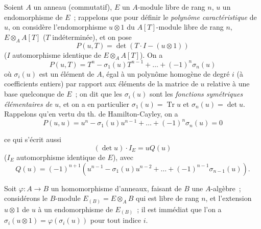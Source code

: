 \begin{env}[6.4.1]
\label{II.6.4.1-fr}
Soient $A$ un anneau (commutatif), $E$ un $A$-module libre de rang $n$, $u$
un endomorphisme de $E$~; rappelons que pour définir le \emph{polynôme
caractéristique} de $u$, on considère l'endomorphisme $u\otimes1$ du
$A[T]$-module libre de rang $n$, $E\otimes_AA[T]$ ($T$ indéterminée), et on
pose
\[
\label{II.6.4.1.1-fr}
P(u,T)=\det(T\cdot I-(u\otimes1))
\tag{6.4.1.1}
\]
($I$ automorphisme identique de $E\otimes_AA[T]$). On a
\[
\label{II.6.4.1.2-fr}
P(u,T)=T^n-\sigma_1(u)T^{n-1}+\ldots+(-1)^n\sigma_n(u)
\tag{6.4.1.2}
\]
où $\sigma_i(u)$ est un élément de $A$, égal à un polynôme homogène de degré
$i$ (à coefficients entiers) par rapport aux éléments de la matrice de $u$
relative à une base quelconque de $E$~; on dit que les $\sigma_i(u)$ sont les
\emph{fonctions symétriques élémentaires de $u$}, et on a en particulier
$\sigma_1(u)=\operatorname{Tr}u$ et $\sigma_n(u)=\det u$. Rappelons qu'en
vertu du th. de Hamilton-Cayley, on a
\[
\label{II.6.4.1.3-fr}
P(u,u)=u^n-\sigma_1(u)u^{n-1}+\ldots+(-1)^n\sigma_n(u)=0
\tag{6.4.1.3}
\]


ce qui s'écrit aussi
\[
\label{II.6.4.1.4-fr}
(\det u)\cdot I_E=uQ(u)
\tag{6.4.1.4}
\]
($I_E$ automorphisme identique de $E$), avec
\[
\label{II.6.4.1.5-fr}
Q(u)=(-1)^{n+1}(u^{n-1}-\sigma_1(u)u^{n-2}+\ldots+(-1)^{n-1}\sigma_{n-1}(u)).
\tag{6.4.1.5}
\]

Soit $\varphi:A\to B$ un homomorphisme d'anneaux, faisant de $B$ une
$A$-algèbre~; considérons le $B$-module
$E_{(B)}=E\otimes_AB$ qui est libre de rang $n$, et l'extension $u\otimes1$
de $u$ à un endomorphisme de $E_{(B)}$~; il est immédiat que l'on a
$\sigma_i(u\otimes1)=\varphi(\sigma_i(u))$ pour tout indice $i$.
\end{env}

